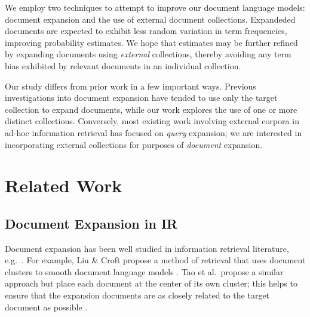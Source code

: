 \documentclass[sigconf]{acmart}
\begin{document}
We employ two techniques to attempt to improve our document language models: document expansion and the use of external document collections. Expandeded documents are expected to exhibit less random variation in term frequencies, improving probability estimates. We hope that estimates may be further refined by expanding documents using \textit{external} collections, thereby avoiding any term bias exhibited by relevant documents in an individual collection.



Our study differs from prior work in a few important ways. Previous investigations into document expansion have tended to use only the target collection to expand documents, while our work explores the use of one or more distinct collections. Conversely, most existing work involving external corpora in ad-hoc information retrieval has focused on \textit{query} expansion; we are interested in incorporating external collections for purposes of \textit{document} expansion.

\section{Related Work}\label{section.related}

\subsection{Document Expansion in IR}\label{section.related.ir}

Document expansion has been well studied in information retrieval literature, e.g.\ \cite{Liu2004, Singhal1999, Tao2006, Wei2006}. For example, Liu \& Croft propose a method of retrieval that uses document clusters to smooth document language models \cite{Liu2004}. Tao et al.\ propose a similar approach but place each document at the center of its own cluster; this helps to ensure that the expansion documents are as closely related to the target document as possible \cite{Tao2006}.
\end{document}
